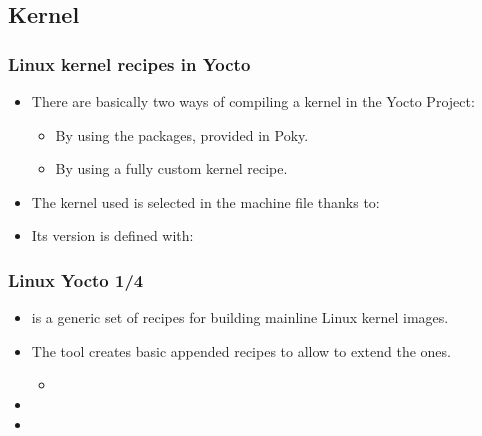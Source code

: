 \subsection{Kernel}

\begin{frame}
  \frametitle{Linux kernel recipes in Yocto}
  \begin{itemize}
    \item There are basically two ways of compiling a kernel in the
      Yocto Project:
      \begin{itemize}
        \item By using the  packages, provided in
          Poky.
        \item By using a fully custom kernel recipe.
      \end{itemize}
    \item The kernel used is selected in the machine file thanks to:
    \item Its version is defined with:
  \end{itemize}
\end{frame}

\begin{frame}
  \frametitle{Linux Yocto 1/4}
  \begin{itemize}
    \item {} is a generic set of recipes for building
      mainline Linux kernel images.
    \item The  tool creates basic appended recipes to
      allow to extend the  ones.
      \begin{itemize}
        \item {}
      \end{itemize}
    \item {}
    \item {}
  \end{itemize}
\end{frame}

